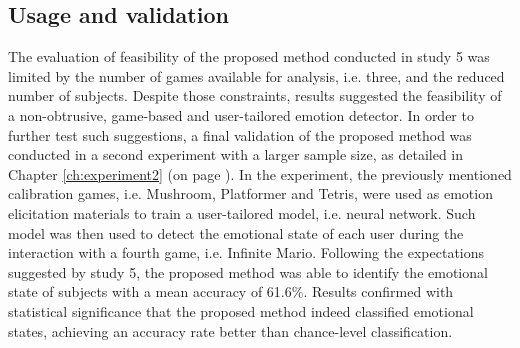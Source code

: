 \subsection{Usage and validation}

The evaluation of feasibility of the proposed method conducted in study 5 was limited by the number of games available for analysis, i.e. three, and the reduced number of subjects. Despite those constraints, results suggested the feasibility of a non-obtrusive, game-based and user-tailored emotion detector. In order to further test such suggestions, a final validation of the proposed method was conducted in a second experiment with a larger sample size, as detailed in Chapter \ref{ch:experiment2} (on page \pageref{ch:experiment2}). In the experiment, the previously mentioned calibration games, i.e. Mushroom, Platformer and Tetris, were used as emotion elicitation materials to train a user-tailored model, i.e. neural network. Such model was then used to detect the emotional state of each user during the interaction with a fourth game, i.e. Infinite Mario. Following the expectations suggested by study 5, the proposed method was able to identify the emotional state of subjects with a mean accuracy of 61.6\%. Results confirmed with statistical significance that the proposed method indeed classified emotional states, achieving an accuracy rate better than chance-level classification.

